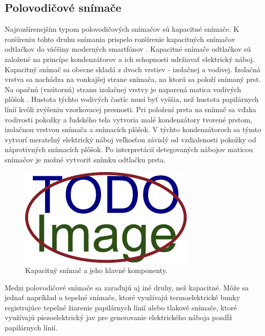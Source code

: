   \subsection{Polovodičové snímače}
  Najrozšírenejším typom polovodičových snímačov sú kapacitné snímače. K rozšíreniu tohto druhu snímania prispelo rozšírenie kapacitných snímačov odtlačkov
  do väčšiny moderných smartfónov \cite{smartphone_sensors}. Kapacitné snímače odtlačkov sú založené na princípe kondenzátorov a ich schopnosti udržiavať
  elektrický náboj. Kapacitný snímač sa obecne skladá z dvoch vrstiev - izolačnej a vodivej. Izolačná vrstva sa nachádza na vonkajšej strane
  snímača, na ktorú sa položí snímaný prst. Na opačnú (vnútornú) stranu izolačnej vrstvy je naparená matica vodivých plôšok \cite{Drahansky}. Hustota týchto
  vodivých častíc musí byť vyššia, než hustota papilárnych línií kvôli zvýšeniu vzorkovacej presnosti. Pri položení prsta na snímač sa vďaka vodivosti
  pokožky a ľudského tela vytvoria malé kondenzátory tvorené prstom, izolačnou vrstvou snímača a snímacích plôšok. V týchto kondenzátoroch sa týmto vytvorí
  merateľný elektrický náboj veľkosťou závislý od vzdialenosti pokožky od náprotivných snímacích plôšok. Po interpretácií detegovaných nábojov maticou
  snímačov je možné vytvoriť snímku odtlačku prsta.
  
  \begin{figure}[h]
    \centering
    \includegraphics[width=0.6\linewidth]{obrazky-figures/placeholder.pdf}
    \caption{Kapacitný snímač a jeho hlavné komponenty.}
    \label{obr:kapac_snimac}
  \end{figure}

  Medzi polovodičové snímače sa zaraďujú aj iné druhy, než kapacitné. Môže sa jednať napríklad o tepelné snímače, ktoré využívajú termoelektrické bunky
  registrujúce tepelné žiarenie papilárnych línií alebo tlakové snímače, ktoré využívajú piezoelektrický jav pre generovanie elektrického náboja
  pozdĺž papilárnych línií.

